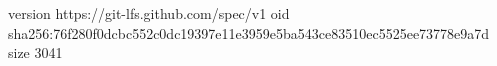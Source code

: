 version https://git-lfs.github.com/spec/v1
oid sha256:76f280f0dcbc552c0dc19397e11e3959e5ba543ce83510ec5525ee73778e9a7d
size 3041
